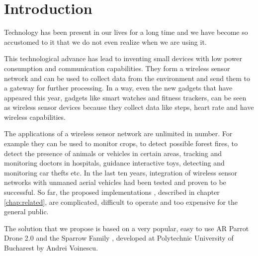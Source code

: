 \normalfont\normalsize
\chapter{Introduction}

Technology has been present in our lives for a long time and we have become so accustomed to it that we do not even realize when we are using it.

This technological advance has lead to inventing small devices with low power consumption and communication capabilities. They form a wireless sensor network and can be used to collect data from the environment and send them to a gateway for further processing. In a way, even the new gadgets that have appeared this year, gadgets like smart watches and fitness trackers, can be seen as wireless sensor devices because they collect data like steps, heart rate and have wireless capabilities.

The applications of a wireless sensor network are unlimited in number. For example they can be used to monitor crops, to detect possible forest fires, to detect the presence of animals or vehicles in certain areas, tracking and monitoring doctors in hospitals, guidance interactive toys, detecting and monitoring car thefts etc. In the last ten years, integration of wireless sensor networks with unmaned aerial vehicles had been tested and proven to be successful. So far, the proposed implementations , described in chapter \ref{chap:related}, are complicated, difficult to operate and too expensive for the general public.

The solution that we propose is based on a very popular, easy to use AR Parrot Drone 2.0 and the Sparrow Family \cite{voinescu2013lightweight}, developed at Polytechnic University of Bucharest by Andrei Voinescu.
